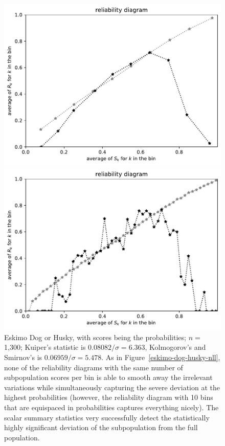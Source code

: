 \documentclass{article}
\begin{document}
\begin{figure}
\begin{centering}
\parbox{\imsize}{\includegraphics[width=\imsize]
                {./codes/unweighted/prob-1-248-Eskimo-dog-huskyequiscore10}}
\quad\quad
\parbox{\imsize}{\includegraphics[width=\imsize]
                {./codes/unweighted/prob-1-248-Eskimo-dog-huskyequiscore50}}

\end{centering}
\caption{Eskimo Dog or Husky, with scores being the probabilities;
         $n =$ 1,300; Kuiper's statistic is $0.08082 / \sigma = 6.363$,
         Kolmogorov's and Smirnov's is $0.06959 / \sigma = 5.478$.
As in Figure~\ref{eskimo-dog-husky-nll}, none of the reliability diagrams
with the same number of subpopulation scores per bin is able to smooth away
the irrelevant variations while simultaneously capturing the severe deviation
at the highest probabilities (however, the reliability diagram with 10 bins
that are equispaced in probabilities captures everything nicely).
The scalar summary statistics very successfully
detect the statistically highly significant deviation
of the subpopulation from the full population.
}
\label{eskimo-dog-husky-prob}
\end{figure}
\end{document}
